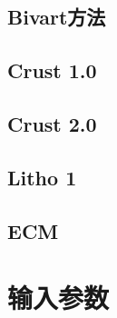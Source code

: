 		\section{Bivart方法}
		\label{Geology: Bivart Method}
		\section{Crust 1.0}
		\section{Crust 2.0}
		\section{Litho 1}
		\section{ECM}
		
	\chapter{输入参数}
